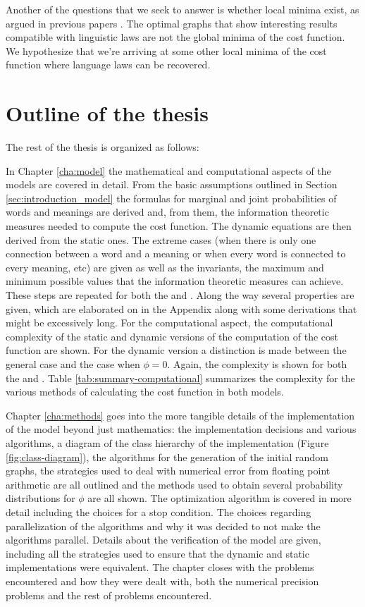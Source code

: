 Another of the questions that we seek to answer is whether local minima exist, as argued in previous papers \cite{Ferrer2017a}.
The optimal graphs that show interesting results compatible with linguistic laws are not the global minima of the cost function.
We hypothesize that we're arriving at some other local minima of the cost function where language laws can be recovered.

\section{Outline of the thesis}
\label{sec:introduction_outline}

The rest of the thesis is organized as follows:

In Chapter \ref{cha:model} the mathematical and computational aspects of the models are covered in detail.
From the basic assumptions outlined in Section \ref{sec:introduction_model} the formulas for marginal and joint probabilities of words and meanings are derived and, from them, the information theoretic measures needed to compute the cost function.
The dynamic equations are then derived from the static ones. The extreme cases (when there is only one connection between a word and a meaning or when every word is connected to every meaning, etc) are given as well as the invariants, the maximum and minimum possible values that the information theoretic measures can achieve.
These steps are repeated for both the \firstm{} and \secondmodel{}.
Along the way several properties are given, which are elaborated on in the Appendix along with some derivations that might be excessively long.
For the computational aspect, the computational complexity of the static and dynamic versions of the computation of the cost function are shown.
For the dynamic version a distinction is made between the general case and the case when $\phi=0$.
Again, the complexity is shown for both the \firstm{} and \secondmodel{}.
Table \ref{tab:summary-computational} summarizes the complexity for the various methods of calculating the cost function in both models.

Chapter \ref{cha:methods} goes into the more tangible details of the implementation of the model beyond just mathematics: the implementation decisions and various algorithms, a diagram of the class hierarchy of the implementation (Figure \ref{fig:class-diagram}), the algorithms for the generation of the initial random graphs, the strategies used to deal with numerical error from floating point arithmetic are all outlined and the methods used to obtain several probability distributions for $\phi$ are all shown.
The optimization algorithm is covered in more detail including the choices for a stop condition.
The choices regarding parallelization of the algorithms and why it was decided to not make the algorithms parallel.
Details about the verification of the model are given, including all the strategies used to ensure that the dynamic and static implementations were equivalent.
The chapter closes with the problems encountered and how they were dealt with, both the numerical precision problems and the rest of problems encountered.

